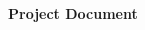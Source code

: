 \documentclass[a4paper, 11pt, oneside]{article}
\begin{document}
\begin{CJK*}{UTF8}{bsmi}
\begin{center}
\LARGE {\textbf{Project Document}}
\end{center}




\end{CJK*}
\end{document}
